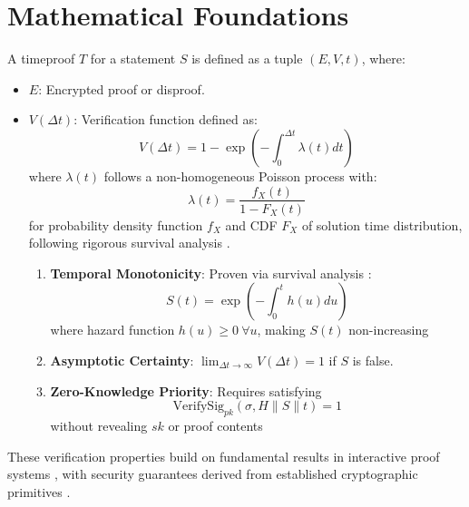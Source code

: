 \documentclass[12pt]{report}
\begin{document}
\section{Mathematical Foundations}

A timeproof \( T \) for a statement \( S \) is defined as a tuple \( (E, V, t) \), where:

\begin{itemize}
    \item \( E \): Encrypted proof or disproof.
    \item \( V(\Delta t) \): Verification function defined as:
    \begin{equation*}
        V(\Delta t) = 1 - \exp\left(-\int_0^{\Delta t} \lambda(t) dt\right)
    \end{equation*}
    where \(\lambda(t)\) follows a non-homogeneous Poisson process with:
    \begin{equation*}
        \lambda(t) = \frac{f_X(t)}{1 - F_X(t)}
    \end{equation*}
    for probability density function \(f_X\) and CDF \(F_X\) of solution time distribution, following rigorous survival analysis \cite{AndersenBorgan1997}.
    \begin{enumerate}
        \item \textbf{Temporal Monotonicity}: Proven via survival analysis \cite{Kleinbaum2012}:
        \begin{equation*}
            S(t) = \exp\left(-\int_0^t h(u)du\right)
        \end{equation*}
        where hazard function \(h(u) \geq 0\ \forall u\), making \(S(t)\) non-increasing
        \item \textbf{Asymptotic Certainty}: \( \lim_{\Delta t \to \infty} V(\Delta t) = 1 \) if \( S \) is false.
        \item \textbf{Zero-Knowledge Priority}: Requires satisfying
        \begin{equation*}
            \text{VerifySig}_{pk}(\sigma, H \parallel S \parallel t) = 1
        \end{equation*}
        without revealing \(sk\) or proof contents
    \end{enumerate}
\end{itemize}

These verification properties build on fundamental results in interactive proof systems \cite{Shamir1992}, with security guarantees derived from established cryptographic primitives \cite{BlumEtAl1986,ChaumEtAl1988}.
\end{document}
